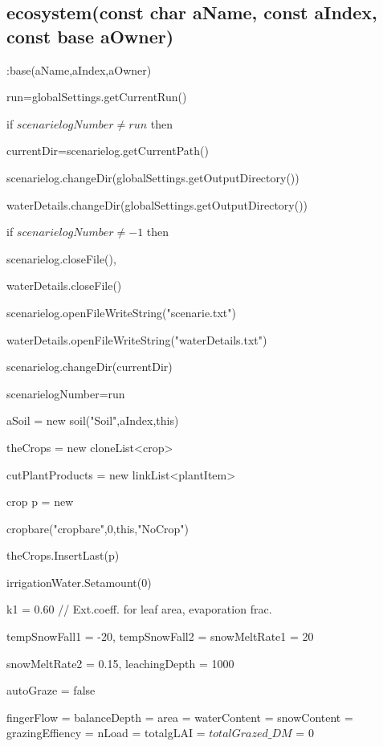 \documentclass[%
]{scrartcl}
\begin{document}
\subsection{ecosystem(const char 
 aName, const aIndex, const base aOwner)}   
:base(aName,aIndex,aOwner)

	 run=globalSettings.getCurrentRun()

	if $scenarielogNumber\ne run$ then
	
	  \quad		 currentDir=scenarielog.getCurrentPath()

	  \quad		 scenarielog.changeDir(globalSettings.getOutputDirectory())
		 
  \quad	 waterDetails.changeDir(globalSettings.getOutputDirectory())
		
  \quad	if $scenarielogNumber\ne -1$ then	

   \quad	  \quad	scenarielog.closeFile(), 	

  \quad	waterDetails.closeFile()
		
   \quad	scenarielog.openFileWriteString("scenarie.txt")
		
  \quad	 waterDetails.openFileWriteString("waterDetails.txt")
		
 \quad	scenarielog.changeDir(currentDir)
		
  \quad	 scenarielogNumber=run
	
	
	aSoil                   = new soil("Soil",aIndex,this)
	
	theCrops                = new cloneList<crop>
   
   cutPlantProducts        = new linkList<plantItem>
  
   crop    p                = new 
   
   cropbare("cropbare",0,this,"NoCrop")
  
   theCrops.InsertLast(p)
   
   irrigationWater.Setamount(0)
	
	k1                      = 0.60 
 // Ext.coeff. for leaf area, evaporation frac.


   tempSnowFall1 = -20,
   tempSnowFall2 = snowMeltRate1 = 20

   snowMeltRate2 = 0.15,  leachingDepth = 1000

   autoGraze               = false

   fingerFlow              =
   balanceDepth            =
    area                    =
   waterContent            =
   snowContent             =
   grazingEffiency         =
   nLoad                   =
    totalgLAI               =
	$totalGrazed\_DM$				= 0
\end{document}
